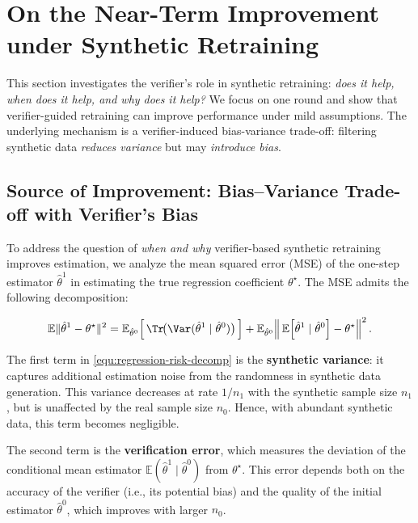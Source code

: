 \section{On the Near-Term Improvement under Synthetic Retraining} 

This section investigates the verifier's role in synthetic retraining: \emph{does it help, when does it help, and why does it help?} 
We focus on one round and show that verifier-guided retraining can improve performance under mild assumptions.
The underlying mechanism is a verifier-induced bias-variance trade-off: filtering synthetic data \emph{reduces variance} but may \emph{introduce bias}. 

\subsection{Source of Improvement:  Bias--Variance Trade-off with Verifier's Bias }  

To address the question of \emph{when and why} verifier-based synthetic retraining improves estimation, we analyze the mean squared error (MSE) of the one-step estimator $\hat{\theta}^1$ in estimating the true regression coefficient $\theta^\star$. The MSE admits the following decomposition:

\begin{equation}\label{equ:regression-risk-decomp}
    \mathbb{E}\|\hat{\theta}^1 - \theta^\star\|^2
    = \mathbb{E}_{\hat{\theta}^0}\!\left[\, \Tr\!\big( \Var(\hat{\theta}^1 \mid \hat{\theta}^0) \big) \,\right]
    + \mathbb{E}_{\hat{\theta}^0}\!\left\|\, 
        \mathbb{E}\!\left[\hat{\theta}^1 \mid \hat{\theta}^0\right] - \theta^\star 
    \right\|^2.
\end{equation}

The first term in \eqref{equ:regression-risk-decomp} is the \textbf{synthetic variance}: it captures additional estimation noise from the randomness in synthetic data generation. This variance decreases at rate $1/n_1$ with the synthetic sample size $n_1$, but is unaffected by the real sample size $n_0$. Hence, with abundant synthetic data, this term becomes negligible.

The second term is the \textbf{verification error}, which measures the deviation of the conditional mean estimator $\mathbb{E}(\hat{\theta}^1 \mid \hat{\theta}^0)$ from $\theta^\star$. This error depends both on the accuracy of the verifier (i.e., its potential bias) and the quality of the initial estimator $\hat{\theta}^0$, which improves with larger $n_0$.

